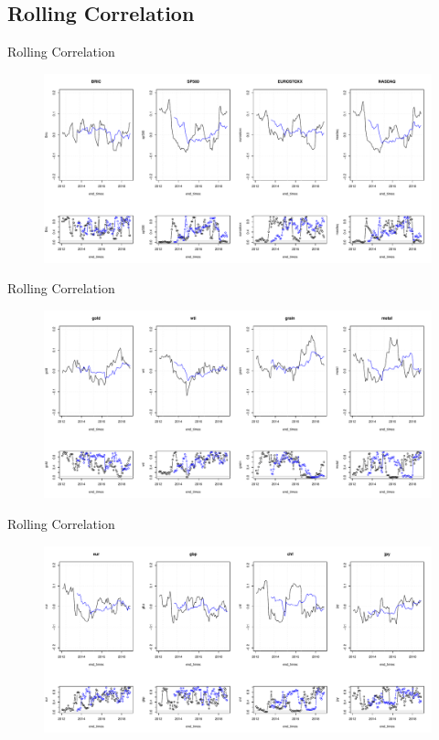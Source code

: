 \documentclass{beamer}
\begin{document}
\subsection{Rolling Correlation}

\begin{frame}{Rolling Correlation}
\begin{figure}
\includegraphics[width=\textwidth]{rolling_stocks.pdf}
\label{roll_stocks}
\end{figure}
\end{frame}

\begin{frame}{Rolling Correlation}
\begin{figure}
\includegraphics[width=\textwidth]{rolling_commodities.pdf}
\label{roll_stocks}
\end{figure}
\end{frame}

\begin{frame}{Rolling Correlation}
\begin{figure}
\includegraphics[width=\textwidth]{rolling_fx.pdf}
\label{roll_stocks}
\end{figure}
\end{frame}
\end{document}
